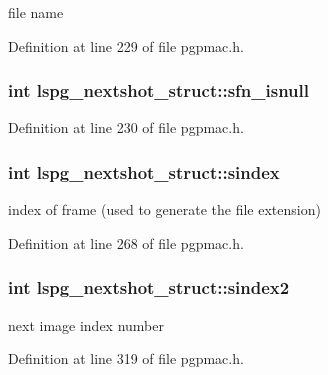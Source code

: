 file name 



Definition at line 229 of file pgpmac.\-h.

\hypertarget{structlspg__nextshot__struct_a56f32eb413b1fca9f085874eb86294de}{
\subsubsection[{sfn\-\_\-isnull}]{\setlength{\rightskip}{0pt plus 5cm}int lspg\-\_\-nextshot\-\_\-struct\-::sfn\-\_\-isnull}}\label{structlspg__nextshot__struct_a56f32eb413b1fca9f085874eb86294de}


Definition at line 230 of file pgpmac.\-h.

\hypertarget{structlspg__nextshot__struct_a5d096f2c2bf9be29c44129b54eaf01da}{
\subsubsection[{sindex}]{\setlength{\rightskip}{0pt plus 5cm}int lspg\-\_\-nextshot\-\_\-struct\-::sindex}}\label{structlspg__nextshot__struct_a5d096f2c2bf9be29c44129b54eaf01da}


index of frame (used to generate the file extension) 



Definition at line 268 of file pgpmac.\-h.

\hypertarget{structlspg__nextshot__struct_ae9d0cfdff6868e0ba9cd5acafbe133db}{
\subsubsection[{sindex2}]{\setlength{\rightskip}{0pt plus 5cm}int lspg\-\_\-nextshot\-\_\-struct\-::sindex2}}\label{structlspg__nextshot__struct_ae9d0cfdff6868e0ba9cd5acafbe133db}


next image index number 



Definition at line 319 of file pgpmac.\-h.

